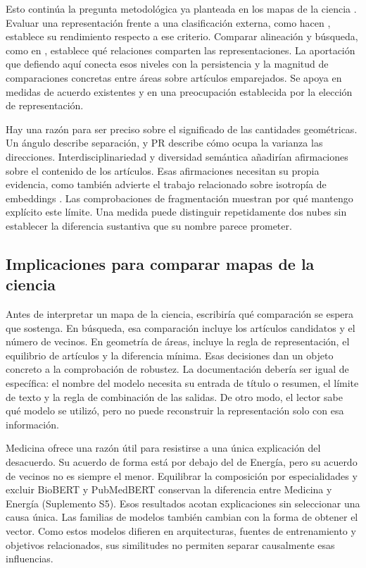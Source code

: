 \documentclass[12pt]{article}
\begin{document}
Esto continúa la pregunta metodológica ya planteada en los mapas de la ciencia \citep{refa0d2d707e6,ref6a2f5912bc}. Evaluar una representación frente a una clasificación externa, como hacen \citet{refc0e2cc29e0}, establece su rendimiento respecto a ese criterio. Comparar alineación y búsqueda, como en \citet{ref4e1e0d5582}, establece qué relaciones comparten las representaciones. La aportación que defiendo aquí conecta esos niveles con la persistencia y la magnitud de comparaciones concretas entre áreas sobre artículos emparejados. Se apoya en medidas de acuerdo existentes y en una preocupación establecida por la elección de representación.

Hay una razón para ser preciso sobre el significado de las cantidades geométricas. Un ángulo describe separación, y PR describe cómo ocupa la varianza las direcciones. Interdisciplinariedad y diversidad semántica añadirían afirmaciones sobre el contenido de los artículos. Esas afirmaciones necesitan su propia evidencia, como también advierte el trabajo relacionado sobre isotropía de embeddings \citep{rudman-etal-2022-isoscore}. Las comprobaciones de fragmentación muestran por qué mantengo explícito este límite. Una medida puede distinguir repetidamente dos nubes sin establecer la diferencia sustantiva que su nombre parece prometer.

\subsection{Implicaciones para comparar mapas de la ciencia}
Antes de interpretar un mapa de la ciencia, escribiría qué comparación se espera que sostenga. En búsqueda, esa comparación incluye los artículos candidatos y el número de vecinos. En geometría de áreas, incluye la regla de representación, el equilibrio de artículos y la diferencia mínima. Esas decisiones dan un objeto concreto a la comprobación de robustez. La documentación debería ser igual de específica: el nombre del modelo necesita su entrada de título o resumen, el límite de texto y la regla de combinación de las salidas. De otro modo, el lector sabe qué modelo se utilizó, pero no puede reconstruir la representación solo con esa información.

Medicina ofrece una razón útil para resistirse a una única explicación del desacuerdo. Su acuerdo de forma está por debajo del de Energía, pero su acuerdo de vecinos no es siempre el menor. Equilibrar la composición por especialidades y excluir BioBERT y PubMedBERT conservan la diferencia entre Medicina y Energía (Suplemento S5). Esos resultados acotan explicaciones sin seleccionar una causa única. Las familias de modelos también cambian con la forma de obtener el vector. Como estos modelos difieren en arquitecturas, fuentes de entrenamiento y objetivos relacionados, sus similitudes no permiten separar causalmente esas influencias.
\end{document}

